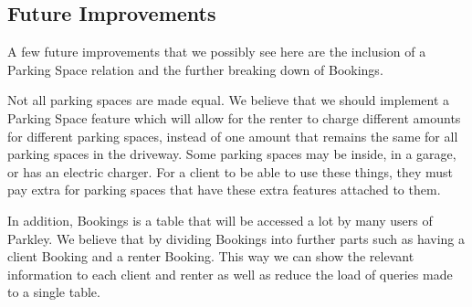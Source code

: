 \documentclass[a4paper]{article}
\begin{document}
\subsection{Future Improvements}

A few future improvements that we possibly see here are the inclusion of a Parking Space relation and the further breaking down of Bookings.

Not all parking spaces are made equal. We believe that we should implement a Parking Space feature which will allow for the renter to charge different amounts for different parking spaces, instead of one amount that remains the same for all parking spaces in the driveway. Some parking spaces may be inside, in a garage, or has an electric charger. For a client to be able to use these things, they must pay extra for parking spaces that have these extra features attached to them. 

In addition, Bookings is a table that will be accessed a lot by many users of Parkley. We believe that by dividing Bookings into further parts such as having a client Booking and a renter Booking. This way we can show the relevant information to each client and renter as well as reduce the load of queries made to a single table.
\end{document}
